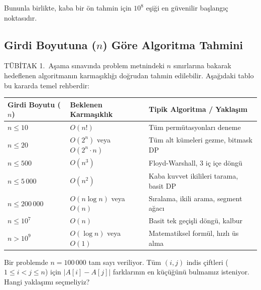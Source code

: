 Bununla birlikte, kaba bir ön tahmin için $10^8$ eşiği en güvenilir başlangıç noktasıdır.

\subsection{Girdi Boyutuna ($n$) Göre Algoritma Tahmini}

TÜBİTAK 1.~Aşama sınavında problem metnindeki $n$ sınırlarına bakarak hedeflenen algoritmanın karmaşıklığı doğrudan tahmin edilebilir. Aşağıdaki tablo bu kararda temel rehberdir:

\begin{center}
\begin{tabular}{|l|p{4.2cm}|p{4.6cm}|}
\hline
\textbf{Girdi Boyutu ($n$)} & \textbf{Beklenen Karmaşıklık} & \textbf{Tipik Algoritma / Yaklaşım} \\
\hline
$n \le 10$ & $O(n!)$ & Tüm permütasyonları deneme \\
$n \le 20$ & $O(2^n)$ veya $O(2^n \cdot n)$ & Tüm alt kümeleri gezme, bitmask DP \\
$n \le 500$ & $O(n^3)$ & Floyd-Warshall, 3 iç içe döngü \\
$n \le 5\,000$ & $O(n^2)$ & Kaba kuvvet ikilileri tarama, basit DP \\
$n \le 200\,000$ & $O(n \log n)$ veya $O(n)$ & Sıralama, ikili arama, segment ağacı \\
$n \le 10^7$ & $O(n)$ & Basit tek geçişli döngü, kalbur \\
$n > 10^9$ & $O(\log n)$ veya $O(1)$ & Matematiksel formül, hızlı üs alma \\
\hline
\end{tabular}
\end{center}

\begin{example}
Bir problemde $n = 100\,000$ tam sayı veriliyor. Tüm $(i, j)$ indis çiftleri ($1 \le i < j \le n$) için $|A[i] - A[j]|$ farklarının en küçüğünü bulmamız isteniyor. Hangi yaklaşımı seçmeliyiz?
\end{example}

